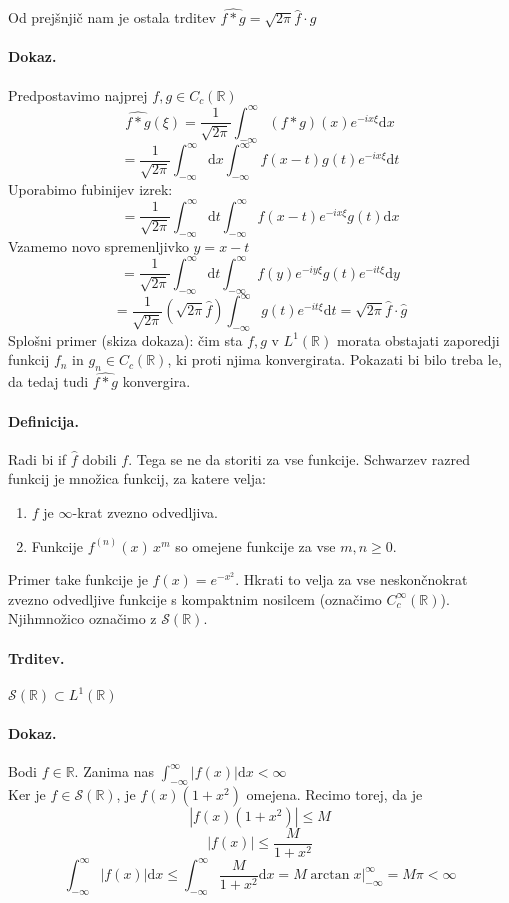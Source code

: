 \documentclass[a4paper]{article}
\newcommand{\dif}{\mathrm{d}}
\newcommand{\R}{\mathbb{R}}
\begin{document}
Od prejšnjič nam je ostala trditev $\displaystyle{\widehat{f * g} = \sqrt{2\pi}\hat{f}\cdot\hat{g}}$
\paragraph{Dokaz.} Predpostavimo najprej $f, g \in C_c(\R)$
$$\widehat{f * g}(\xi) = \frac{1}{\sqrt{2\pi}}\int_{-\infty}^{\infty}(f * g)(x) e^{-ix\xi}\dif x$$
$$= \frac{1}{\sqrt{2\pi}}\int_{-\infty}^{\infty} \dif x \int_{-\infty}^{\infty}f(x-t)g(t)e^{-ix\xi}\dif t$$
Uporabimo fubinijev izrek:
$$= \frac{1}{\sqrt{2\pi}}\int_{-\infty}^{\infty}\dif t\int_{-\infty}^{\infty}f(x-t)e^{-ix\xi}g(t)\dif x$$
Vzamemo novo spremenljivko $y = x-t$
$$= \frac{1}{\sqrt{2\pi}}\int_{-\infty}^{\infty}\dif t\int_{-\infty}^{\infty}f(y)e^{-iy\xi}g(t)e^{-it\xi}\dif y$$
$$= \frac{1}{\sqrt{2\pi}}\left(\sqrt{2\pi} \hat{f}\right)\int_{-\infty}^{\infty}g(t)e^{-it\xi}\dif t = \sqrt{2\pi}\hat{f}\cdot\hat{g}$$
Splošni primer (skiza dokaza): čim sta $f, g$ v $L^1(\R)$ morata obstajati zaporedji funkcij $f_n$ in $g_n \in C_c(\R)$, ki proti njima konvergirata.
Pokazati bi bilo treba le, da tedaj tudi $\widehat{f * g}$ konvergira.
\paragraph{Definicija.} Radi bi if $\hat{f}$ dobili $f$. Tega se ne da storiti za vse funkcije. Schwarzev razred funkcij je množica funkcij, za katere velja:
\begin{enumerate}
    \item $f$ je $\infty$-krat zvezno odvedljiva.
    \item Funkcije $f^{(n)}(x) \, x^{m}$ so omejene funkcije za vse $m, n \geq 0$.
\end{enumerate}
Primer take funkcije je $f(x) = e^{-x^2}$. Hkrati to velja za vse neskončnokrat zvezno odvedljive funkcije s kompaktnim nosilcem (označimo $C_c^{\infty}(\R)$).
Njihmnožico označimo z $\mathcal{S}(\R)$.
\paragraph{Trditev.} $\mathcal{S}(\R) \subset L^1(\R)$
\paragraph{Dokaz.} Bodi $f\in\mathcal{\R}$. Zanima nas $\displaystyle{\int_{-\infty}^{\infty}}|f(x)|\dif x < \infty$ \\[3mm]
Ker je $f\in\mathcal{S}(\R)$, je $f(x)\left(1 + x^2\right)$ omejena. Recimo torej, da je $$|f(x)\left(1 + x^2\right)| \leq M$$
$$|f(x)| \leq \frac{M}{1 + x^2}$$
$$\int_{-\infty}^{\infty}|f(x)|\dif x \leq \int_{-\infty}^{\infty}\frac{M}{1 + x^2}\dif x = M\arctan x\Big|_{-\infty}^{\infty} = M\pi < \infty$$
\end{document}
